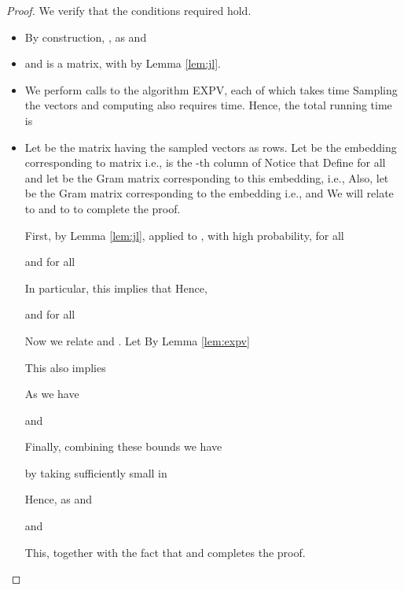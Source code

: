 \documentclass[twoside,leqno,twocolumn]{article}
\numberwithin{equation}{section}
\begin{document}
\begin{proof}
We verify that the conditions required hold.
\begin{itemize}
\item By construction, , as  and 
\item  and  is a  matrix, with  by Lemma \ref{lem:jl}.
\item We perform  calls to the algorithm {\sf EXPV}, each of which takes time  Sampling the vectors  and computing  also requires  time. Hence, the total running time is 

\item Let  be the  matrix having the sampled vectors  as rows. 
Let 
be the embedding corresponding to matrix  i.e.,  is the -th column of  Notice that 
Define  for all  and let  be the Gram matrix corresponding to this embedding, i.e., 
Also, let  be the Gram matrix corresponding to the embedding  i.e.,  and 
We will relate  to  and  to  to complete the proof.

First, by Lemma \ref{lem:jl}, applied to , with high probability, for all 

and for all 

In particular, this implies that 
Hence,

and for all 


Now we relate  and . Let  
By Lemma \ref{lem:expv} 

This also implies

As  we have

and


Finally, combining these bounds we have

by taking  sufficiently small in 

Hence, as  and 
 
and

This, together with the fact that  and  completes the proof.
\end{itemize}


\end{proof}
\end{document}
